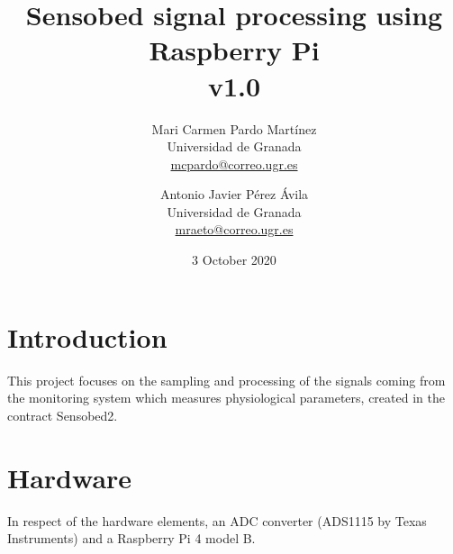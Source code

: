 \documentclass[twoside, twocolumn, spanish] {article}
\title{Sensobed signal processing using Raspberry Pi\\[0.5cm]	
	\Large{v1.0} \\
}
\author{%
	Mari Carmen Pardo Martínez \\
	\normalsize{Universidad de Granada}\\
	\normalsize{\href{mailto:mcpardo@correo.ugr.es}{mcpardo@correo.ugr.es}}
	\and
	Antonio Javier Pérez Ávila \\
	\normalsize{Universidad de Granada}\\
	\normalsize{\href{mailto:mraeto@correo.ugr.es}{mraeto@correo.ugr.es}}
	}
\date{3 October 2020}
\begin{document}
\thispagestyle{empty}
\maketitle

\tableofcontents

\section{Introduction}

This project focuses on the sampling and processing of the signals coming from the monitoring system which measures physiological parameters, created in the contract Sensobed2.

\section{Hardware}
In respect of the hardware elements, an ADC converter (ADS1115 by Texas Instruments) and a Raspberry Pi 4 model B.
\end{document}
